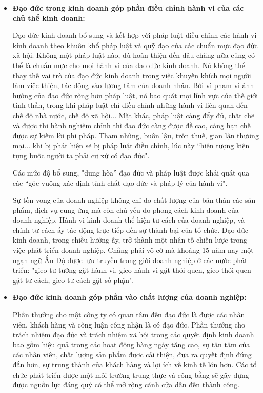 \documentclass{article}
\begin{document}
            \begin{itemize}
                \item \textbf{Đạo đức trong kinh doanh góp phần điều chỉnh hành vi của các chủ thể kinh doanh:}

                \qquad Đạo đức kinh doanh bổ sung và kết hợp với pháp luật điều chỉnh các hành vi kinh doanh theo khuôn khổ pháp luật và quỹ đạo của các chuẩn mực đạo đức xã hội. Không một pháp luật nào, dù hoàn thiện đến đâu chăng nữa cũng có thể là chuẩn mực cho mọi hành vi của đạo đức kinh doanh. Nó không thể thay thế vai trò của đạo đức kinh doanh trong việc khuyến khích mọi người làm việc thiện, tác động vào lương tâm của doanh nhân. Bởi vì phạm vi ảnh hưởng của đạo đức rộng hơn pháp luật, nó bao quát mọi lĩnh vực của thế giới tinh thần, trong khi pháp luật chỉ điều chỉnh những hành vi liên quan đến chế độ nhà nước, chế độ xã hội... Mặt khác, pháp luật càng đẩy đủ, chặt chẽ và được thi hành nghiêm chỉnh thì đạo đức càng được đề cao, càng hạn chế được sự kiếm lời phi pháp. Tham nhũng, buôn lậu, trốn thuế, gian lận thương mại... khi bị phát hiện sẽ bị pháp luật điều chỉnh, lúc này “hiện tượng kiện tụng buộc người ta phải cư xử có đạo đức".

                \qquad Các mức độ bổ sung, "dung hòa” đạo đức và pháp luật được khái quát qua các “góc vuông xác định tính chất đạo đức và pháp lý của hành vi".

                \qquad Sự tồn vong của doanh nghiệp không chỉ do chất lượng của bản thân các sản phẩm, dịch vụ cung ứng mà còn chủ yếu do phong cách kinh doanh của doanh nghiệp. Hành vi kinh doanh thể hiện tư cách của doanh nghiệp, và chính tư cách ấy tác động trực tiếp đến sự thành bại của tổ chức. Đạo đức kinh doanh, trong chiều hướng ấy, trở thành một nhân tố chiến lược trong việc phát triển doanh nghiệp. Chẳng phải vô cớ mà khoảng 15 năm nay một ngạn ngữ Ấn Độ được lưu truyền trong giới doanh nghiệp ở các nước phát triển: "gieo tư tưởng gặt hành vi, gieo hành vi gặt thói quen, gieo thói quen gặt tư cách, gieo tư cách gặt số phận".

                \item \textbf{Đạo đức kinh doanh góp phần vào chất lượng của doanh nghiệp:}
                
                \qquad Phần thưởng cho một công ty có quan tâm đến đạo đức là được các nhân viên, khách hàng và công luận công nhận là có đạo đức. Phần thưởng cho trách nhiệm đạo đức và trách nhiệm xã hội trong các quyết định kinh doanh bao gồm hiệu quả trong các hoạt động hàng ngày tăng cao, sự tận tâm của các nhân viên, chất lượng sản phẩm được cải thiện, đưa ra quyết định đúng đắn hơn, sự trung thành của khách hàng và lợi ích về kinh tế lớn hơn. Các tổ chức phát triển được một môi trường trung thực và công bằng sẽ gây dựng được nguồn lực đáng quý có thể mở rộng cánh cửa dẫn đến thành công.


\end{itemize}
\end{document}
